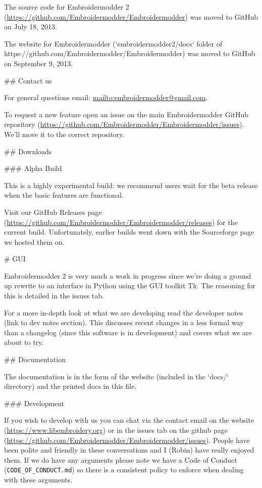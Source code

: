 The source code for Embroidermodder 2
(\url{https://github.com/Embroidermodder/Embroidermodder}) was moved to GitHub
on July 18, 2013.

The website for Embroidermodder (`embroidermodder2/docs` folder of
https://github.com/Embroidermodder/Embroidermodder) was moved to
GitHub on September 9, 2013.

## Contact us

For general questions email: \url{mailto:embroidermodder@gmail.com}.

To request a new feature  open an issue on the main Embroidermodder GitHub
repository (\url{https://github.com/Embroidermodder/Embroidermodder/issues}).
We'll move it to the correct repository.

## Downloads

### Alpha Build

This is a highly experimental build: we recommend users wait for the beta
release when the basic features are functional.

Visit our  GitHub Releases page
(\url{https://github.com/Embroidermodder/Embroidermodder/releases})
for the current build. Unfortunately, earlier builds went down with the
Sourceforge page we hosted them on.

# GUI

Embroidermodder 2 is very much a work in progress since we're doing a ground
up rewrite to an interface in Python using the GUI toolkit Tk. The reasoning for
this is detailed in the issues tab.

For a more in-depth look at what we are developing read the developer notes (link to dev notes
section). This discusses recent changes in a less formal way than a changelog (since this
software is in development) and covers what we are about to try.

## Documentation

The documentation is in the form of the website
(included in the `docs/` directory) and the printed docs in this file.

### Development

If you wish to develop with us you can chat via the contact email on the
website (\url{https://www.libembroidery.org}) or in the issues tab on the
github page (\url{https://github.com/Embroidermodder/Embroidermodder/issues}).
People have been polite and friendly in these conversations and I (Robin) have
really enjoyed them. If we do have any arguments please note we have a Code of
Conduct (\texttt{CODE\_OF\_CONDUCT.md}) so there is a consistent policy to enforce when
dealing with these arguments.

